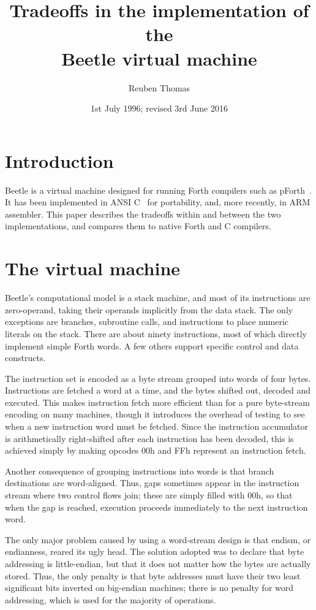 \documentclass{article}
\title{Tradeoffs in the implementation of the\\Beetle virtual machine}
\author{Reuben Thomas}
\date{1st July 1996; revised 3rd June 2016}
\begin{document}
\maketitle


\section{Introduction}

Beetle is a virtual machine designed for running Forth compilers such as
pForth~\cite{beetledis}. It has been implemented in ANSI C~\cite{beetledis} for
portability, and, more recently, in ARM assembler. This paper describes the
tradeoffs within and between the two implementations, and compares them to
native Forth and C compilers.


\section{The virtual machine}

Beetle's computational model is a stack machine, and most of its instructions
are zero-operand, taking their operands implicitly from the data stack. The
only exceptions are branches, subroutine calls, and instructions to place
numeric literals on the stack. There are about ninety instructions, most of
which directly implement simple Forth words. A few others support specific
control and data constructs.

The instruction set is encoded as a byte stream grouped into words of four
bytes. Instructions are fetched a word at a time, and the bytes shifted out,
decoded and executed. This makes instruction fetch more efficient than for a
pure byte-stream encoding on many machines, though it introduces the overhead
of testing to see when a new instruction word must be fetched. Since the
instruction accumulator is arithmetically right-shifted after each
instruction has been decoded, this is achieved simply by making opcodes 00h
and FFh represent an instruction fetch.

Another consequence of grouping instructions into words is that branch
destinations are word-aligned. Thus, gaps sometimes appear in the
instruction stream where two control flows join; these are simply filled with
00h, so that when the gap is reached, execution proceeds immediately to the
next instruction word.

The only major problem caused by using a word-stream design is that endism,
or endianness, reared its ugly head. The solution adopted was to declare that
byte addressing is little-endian, but that it does not matter how the bytes
are actually stored. Thus, the only penalty is that byte addresses must have
their two least significant bits inverted on big-endian machines; there is no
penalty for word addressing, which is used for the majority of operations.
\end{document}
